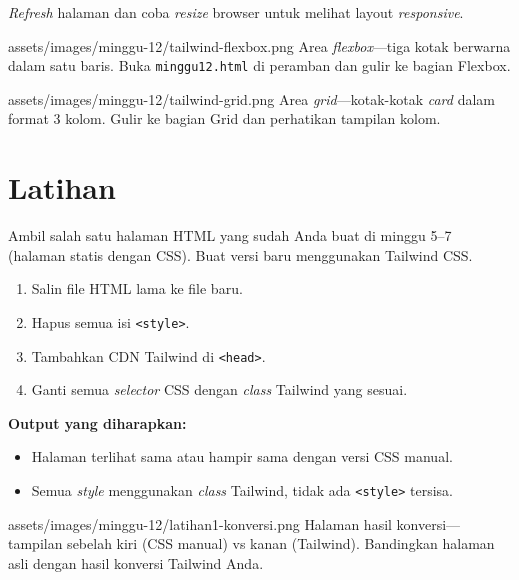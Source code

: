 \begin{langkah}
  \item \emph{Refresh} halaman dan coba \emph{resize} browser untuk melihat layout \emph{responsive}.
\end{langkah}

\begin{tangkapanlayar}
  {assets/images/minggu-12/tailwind-flexbox.png}
  {Area \emph{flexbox}---tiga kotak berwarna dalam satu baris.}
  {Buka \texttt{minggu12.html} di peramban dan gulir ke bagian Flexbox.}
\end{tangkapanlayar}

\begin{tangkapanlayar}
  {assets/images/minggu-12/tailwind-grid.png}
  {Area \emph{grid}---kotak-kotak \emph{card} dalam format 3 kolom.}
  {Gulir ke bagian Grid dan perhatikan tampilan kolom.}
\end{tangkapanlayar}

\section{Latihan}
\label{sec:12-latihan}

\begin{latihan}
Ambil salah satu halaman HTML yang sudah Anda buat di minggu 5--7 (halaman statis dengan CSS). Buat versi baru menggunakan Tailwind CSS.

\begin{enumerate}
  \item Salin file HTML lama ke file baru.
  \item Hapus semua isi \texttt{<style>}.
  \item Tambahkan CDN Tailwind di \texttt{<head>}.
  \item Ganti semua \emph{selector} CSS dengan \emph{class} Tailwind yang sesuai.
\end{enumerate}

\textbf{Output yang diharapkan:}
\begin{itemize}
  \item Halaman terlihat sama atau hampir sama dengan versi CSS manual.
  \item Semua \emph{style} menggunakan \emph{class} Tailwind, tidak ada \texttt{<style>} tersisa.
\end{itemize}

\begin{tangkapanlayar}
  {assets/images/minggu-12/latihan1-konversi.png}
  {Halaman hasil konversi---tampilan sebelah kiri (CSS manual) vs kanan (Tailwind).}
  {Bandingkan halaman asli dengan hasil konversi Tailwind Anda.}
\end{tangkapanlayar}
\end{latihan}

